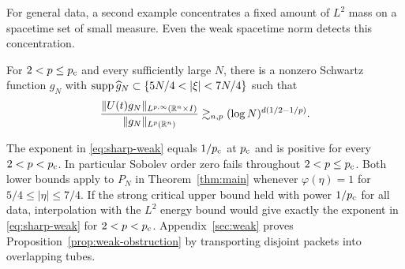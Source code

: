 For general data, a second example concentrates a fixed amount of
$L^2$ mass on a spacetime set of small measure. Even the weak
spacetime norm detects this concentration.

\begin{proposition}\label{prop:weak-obstruction}
For $2<p\le p_{\mathrm c}$ and every sufficiently large $N$, there is a nonzero
Schwartz function $g_N$ with
$\supp\widehat g_N\subset\{5N/4<|\xi|<7N/4\}$ such that
\begin{equation}\label{eq:sharp-weak}
 \frac{\|U(t)g_N\|_{L^{p,\infty}(\mathbb R^n\times I)}}{\|g_N\|_{L^p(\mathbb R^n)}}
     \gtrsim_{n,p}(\log N)^{d(1/2-1/p)}.
\end{equation}
\end{proposition}

The exponent in \eqref{eq:sharp-weak} equals $1/p_{\mathrm c}$ at $p_{\mathrm c}$
and is positive for every $2<p<p_{\mathrm c}$. In particular Sobolev order zero
fails throughout $2<p\le p_{\mathrm c}$. Both lower bounds apply to
$P_N$ in Theorem~\ref{thm:main} whenever $\varphi(\eta)=1$ for
$5/4\le|\eta|\le7/4$. If the strong critical upper bound held with
power $1/p_{\mathrm c}$ for all data, interpolation with the $L^2$ energy
bound would give exactly the exponent in \eqref{eq:sharp-weak} for
$2<p<p_{\mathrm c}$. Appendix~\ref{sec:weak} proves
Proposition~\ref{prop:weak-obstruction} by transporting disjoint packets
into overlapping tubes.
